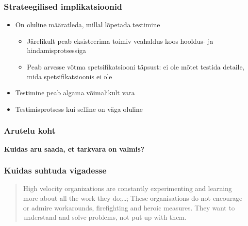 \begin{frame}[fragile]
  \frametitle{Strateegilised implikatsioonid}
	\begin{itemize}
		\item On oluline määratleda, millal lõpetada testimine
		\begin{itemize}
			\item Järelikult peab eksisteerima toimiv veahaldus koos hooldus- ja hindamisprotsessiga
			\item Peab arvesse võtma spetsifikatsiooni täpsust: ei ole mõtet testida detaile, mida spetsifikatsioonis ei ole
		\end{itemize}
		\item Testimine peab algama võimalikult vara
		\item Testimisprotsess kui selline on väga oluline
	\end{itemize}
	
\end{frame}


\begin{frame}[fragile]
  \frametitle{Arutelu koht}
		\begin{center}
			\textbf{Kuidas aru saada, et tarkvara on valmis?}
		\end{center}
\end{frame}

\begin{frame}[fragile]
	\frametitle{Kuidas suhtuda vigadesse}
	\vfill
	\begin{center}
	\begin{quote}
		High velocity organizations are constantly experimenting and learning more about all the work they do;\dots; These organisations do not encourage or admire workarounds, firefighting and heroic measures. They want to understand and solve problems, not put up with them.
		\end{quote}
	\end{center}
	\cite{spear2010high}
\end{frame}

